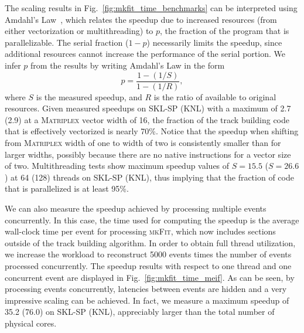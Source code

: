 \documentclass[a4paper,11pt]{article}
\newcommand{\mplex}{\textsc{Matriplex}\xspace}
\newcommand{\mkFit}{\textsc{mkFit}\xspace}
\begin{document}
The scaling results in Fig.~\ref{fig:mkfit_time_benchmarks} can be interpreted using Amdahl's Law~\cite{ref:amdahl}, which relates the speedup due to increased resources (from either vectorization or multithreading) to $p$, the fraction of the program that is parallelizable. The serial fraction ($1 - p$) necessarily limits the speedup, since additional resources cannot increase the performance of the serial portion.
We infer $p$ from the results by writing Amdahl's Law in the form
\begin{equation}
  \label{eq:amdahl}
  p = \frac{1-(1/S)}{1-(1/R)},
\end{equation}
where $S$ is the measured speedup, and $R$ is the ratio of available to original resources. 
Given measured speedups on SKL-SP (KNL) with a maximum of 2.7 (2.9) at a \mplex vector width of 16, the fraction of the track building code that is effectively vectorized is nearly 70\%. Notice that the speedup when shifting from \mplex width of one to width of two is consistently smaller than for larger widths, possibly because there are no native instructions for a vector size of two.
Multithreading tests show maximum speedup values of $S=15.5$ ($S=26.6$) at 64 (128) threads on SKL-SP (KNL), thus implying that the fraction of code that is parallelized is at least 95\%.

We can also measure the speedup achieved by processing multiple events concurrently. In this case, the time used for computing the speedup is the average wall-clock time per event for processing \mkFit, which now includes sections outside of the track building algorithm. In order to obtain full thread utilization, we increase the workload to reconstruct 5000 events times the number of events processed concurrently. The speedup results with respect to one thread and one concurrent event are displayed in Fig.~\ref{fig:mkfit_time_meif}. As can be seen, by processing events concurrently, latencies between events are hidden and a very impressive scaling can be achieved. In fact, we measure a maximum speedup of 35.2 (76.0) on SKL-SP (KNL), appreciably larger than the total number of physical cores.
\end{document}
